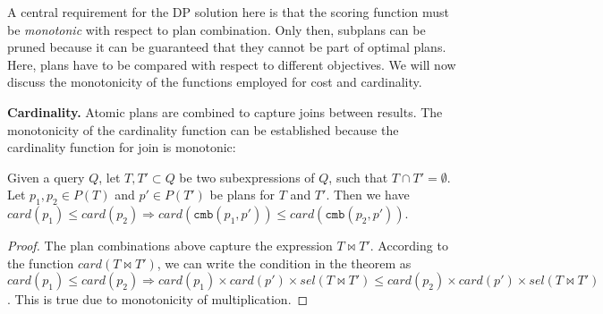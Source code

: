 
A central requirement for the DP solution here is that the scoring function must be \emph{monotonic} with respect to plan combination. 
Only then, subplans can be pruned because it can be guaranteed that they cannot be part of optimal plans. Here, plans have to be compared with respect to different objectives. We will now discuss the monotonicity of the functions employed for cost and cardinality. 

\textbf{Cardinality.} Atomic plans are combined to capture joins between results. The monotonicity of the cardinality function can be established because the cardinality function for join is monotonic:

\begin{lemma}
  Given a query $Q$, let $T,T' \subset Q$ be two subexpressions of
  $Q$, such that $T \cap T' = \emptyset$. Let $p_1,p_2 \in P(T)$ and
  $p' \in P(T')$ be plans for $T$ and $T'$. Then we have $card(p_1) \leq
  card(p_2) \Rightarrow card(\mathtt{cmb}(p_1,p')) \leq
  card(\mathtt{cmb}(p_2,p'))$.
\end{lemma}
\begin{proof}
  The plan combinations above capture the expression $T \Join T'$. According to the function $card(T \Join T')$, we can write the condition in
  the theorem as $card(p_1) \leq card(p_2) \Rightarrow card(p_1)
  \times card(p') \times sel(T \Join T') \leq card(p_2) \times card(p') \times
  sel(T \Join T')$. This is true due to monotonicity of multiplication.
\end{proof}


